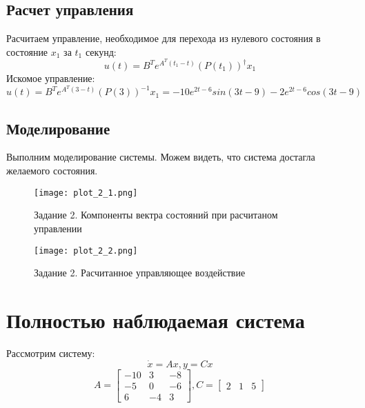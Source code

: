 \subsection{Расчет управления}
Расчитаем управление, необходимое для перехода из нулевого состояния в состояние $x_1$ за $t_1$ секунд:
\begin{equation}
    u(t) = B^Te^{A^T(t_1-t)}(P(t_1))^{\dagger}x_1
\end{equation}
Искомое управление:
\begin{equation*}
    u(t) = B^Te^{A^T(3-t)}(P(3))^{-1}x_1 = -10e^{2t-6}sin(3t-9) - 2e^{2t-6}cos(3t-9)
\end{equation*}

\subsection{Моделирование}
Выполним моделирование системы. Можем видеть, что система достагла желаемого состояния.
\begin{figure}[h]
    \centering
    \texttt{[image: plot\_2\_1.png]}
    \caption{\label{fig:The-caption-1}Задание 2. Компоненты вектра состояний при расчитаном управлении}
\end{figure}

\begin{figure}[]
    \centering
    \texttt{[image: plot\_2\_2.png]}
    \caption{\label{fig:The-caption-1}Задание 2. Расчитанное управляющее воздействие}
\end{figure}
\pagebreak

\section{Полностью наблюдаемая система}
Рассмотрим систему:
\begin{equation}
    \dot{x} = Ax, y = Cx
\end{equation}
\begin{equation*}
    A = \begin{bmatrix}
        -10 & 3 & -8 \\
        -5 & 0 & -6 \\
        6 & -4 & 3
    \end{bmatrix},
    C = \begin{bmatrix}
        2 & 1 & 5
    \end{bmatrix}
\end{equation*}

